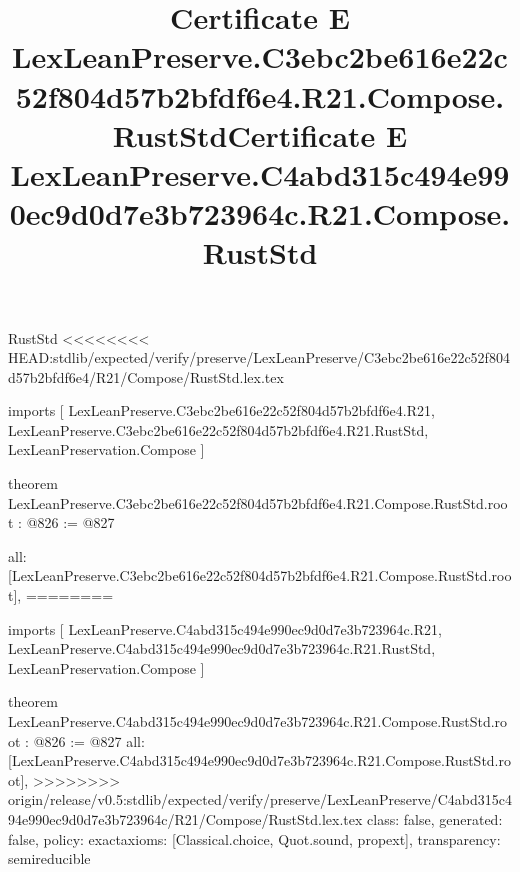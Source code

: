 \begin{lexlean}{RustStd}
<<<<<<<< HEAD:stdlib/expected/verify/preserve/LexLeanPreserve/C3ebc2be616e22c52f804d57b2bfdf6e4/R21/Compose/RustStd.lex.tex
\title{Certificate E LexLeanPreserve.C3ebc2be616e22c52f804d57b2bfdf6e4.R21.Compose.RustStd}
\begin{coremodule}
imports [
  LexLeanPreserve.C3ebc2be616e22c52f804d57b2bfdf6e4.R21,
  LexLeanPreserve.C3ebc2be616e22c52f804d57b2bfdf6e4.R21.RustStd,
  LexLeanPreservation.Compose
]

theorem LexLeanPreserve.C3ebc2be616e22c52f804d57b2bfdf6e4.R21.Compose.RustStd.root : @826 := @827 {
  all: [LexLeanPreserve.C3ebc2be616e22c52f804d57b2bfdf6e4.R21.Compose.RustStd.root],
========
\title{Certificate E LexLeanPreserve.C4abd315c494e990ec9d0d7e3b723964c.R21.Compose.RustStd}
\begin{coremodule}
imports [
  LexLeanPreserve.C4abd315c494e990ec9d0d7e3b723964c.R21,
  LexLeanPreserve.C4abd315c494e990ec9d0d7e3b723964c.R21.RustStd,
  LexLeanPreservation.Compose
]

theorem LexLeanPreserve.C4abd315c494e990ec9d0d7e3b723964c.R21.Compose.RustStd.root : @826 := @827 {
  all: [LexLeanPreserve.C4abd315c494e990ec9d0d7e3b723964c.R21.Compose.RustStd.root],
>>>>>>>> origin/release/v0.5:stdlib/expected/verify/preserve/LexLeanPreserve/C4abd315c494e990ec9d0d7e3b723964c/R21/Compose/RustStd.lex.tex
  class: false,
  generated: false,
  policy: exact{axioms: [Classical.choice, Quot.sound, propext]},
  transparency: semireducible
}


\end{coremodule}}
\end{coremodule}
\end{lexlean}

